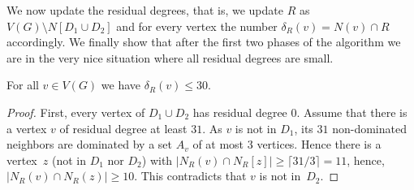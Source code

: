 We now update the residual degrees, that is, we update $R$ as
$V(G)\setminus N[D_1\cup D_2]$ and for every vertex the number
$\delta_R(v)=N(v)\cap R$ accordingly.
%
We finally show that after the first two phases of the algorithm we
are in the very nice situation where all residual degrees are
small. %

  \begin{lemma}\label{lem:res-degree}
    For all $v\in V(G)$ we have $\delta_R(v)\leq 30$.
  \end{lemma}
  \begin{proof}
    First, every vertex of $D_1\cup D_2$ has residual degree $0$.
    Assume that there is a vertex $v$ of residual degree at least $31$.
    As $v$ is not in $D_1$, its $31$ non-dominated neighbors are
    dominated by a set $A_v$ of at most 3 vertices. Hence there is a
    vertex~$z$ (not in $D_1$ nor $D_2$) with $|N_R(v)\cap N_R[z]|\geq
    \lceil 31/3\rceil = 11$, hence, $|N_R(v)\cap N_R(z)|\geq 10$.
	This contradicts that $v$ is not in~$D_2$.
  \end{proof}
